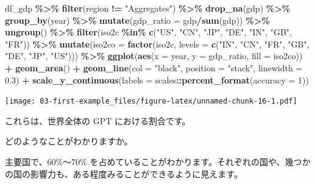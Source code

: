 \documentclass[
  xelatex, ja=standard]{bxjsbook}
\newenvironment{Shaded}{\begin{snugshade}}{\end{snugshade}}
\newcommand{\AttributeTok}[1]{\textcolor[rgb]{0.13,0.29,0.53}{#1}}
\newcommand{\DecValTok}[1]{\textcolor[rgb]{0.00,0.00,0.81}{#1}}
\newcommand{\FloatTok}[1]{\textcolor[rgb]{0.00,0.00,0.81}{#1}}
\newcommand{\FunctionTok}[1]{\textcolor[rgb]{0.13,0.29,0.53}{\textbf{#1}}}
\newcommand{\NormalTok}[1]{#1}
\newcommand{\SpecialCharTok}[1]{\textcolor[rgb]{0.81,0.36,0.00}{\textbf{#1}}}
\newcommand{\StringTok}[1]{\textcolor[rgb]{0.31,0.60,0.02}{#1}}
\theoremstyle{definition}
\theoremstyle{definition}
\theoremstyle{definition}
\theoremstyle{definition}
\theoremstyle{remark}
\begin{document}
\begin{Shaded}
\begin{Highlighting}[]
\NormalTok{df\_gdp }\SpecialCharTok{\%\textgreater{}\%} 
  \FunctionTok{filter}\NormalTok{(region }\SpecialCharTok{!=} \StringTok{"Aggregates"}\NormalTok{) }\SpecialCharTok{\%\textgreater{}\%} \FunctionTok{drop\_na}\NormalTok{(gdp) }\SpecialCharTok{\%\textgreater{}\%} 
  \FunctionTok{group\_by}\NormalTok{(year) }\SpecialCharTok{\%\textgreater{}\%} \FunctionTok{mutate}\NormalTok{(}\AttributeTok{gdp\_ratio =}\NormalTok{ gdp}\SpecialCharTok{/}\FunctionTok{sum}\NormalTok{(gdp)) }\SpecialCharTok{\%\textgreater{}\%} \FunctionTok{ungroup}\NormalTok{() }\SpecialCharTok{\%\textgreater{}\%}
  \FunctionTok{filter}\NormalTok{(iso2c }\SpecialCharTok{\%in\%} \FunctionTok{c}\NormalTok{(}\StringTok{"US"}\NormalTok{, }\StringTok{"CN"}\NormalTok{, }\StringTok{"JP"}\NormalTok{, }\StringTok{"DE"}\NormalTok{, }\StringTok{"IN"}\NormalTok{, }\StringTok{"GB"}\NormalTok{, }\StringTok{"FR"}\NormalTok{))  }\SpecialCharTok{\%\textgreater{}\%}
  \FunctionTok{mutate}\NormalTok{(}\AttributeTok{iso2co =} \FunctionTok{factor}\NormalTok{(iso2c, }\AttributeTok{levels =} \FunctionTok{c}\NormalTok{(}\StringTok{"IN"}\NormalTok{, }\StringTok{"CN"}\NormalTok{, }\StringTok{"FR"}\NormalTok{, }\StringTok{"GB"}\NormalTok{, }\StringTok{"DE"}\NormalTok{, }\StringTok{"JP"}\NormalTok{, }\StringTok{"US"}\NormalTok{))) }\SpecialCharTok{\%\textgreater{}\%}
  \FunctionTok{ggplot}\NormalTok{(}\FunctionTok{aes}\NormalTok{(}\AttributeTok{x =}\NormalTok{ year, }\AttributeTok{y =}\NormalTok{ gdp\_ratio, }\AttributeTok{fill =}\NormalTok{ iso2co)) }\SpecialCharTok{+} \FunctionTok{geom\_area}\NormalTok{() }\SpecialCharTok{+}
  \FunctionTok{geom\_line}\NormalTok{(}\AttributeTok{col =} \StringTok{"black"}\NormalTok{, }\AttributeTok{position =} \StringTok{"stack"}\NormalTok{, }\AttributeTok{linewidth =} \FloatTok{0.3}\NormalTok{) }\SpecialCharTok{+} 
  \FunctionTok{scale\_y\_continuous}\NormalTok{(}\AttributeTok{labels =}\NormalTok{ scales}\SpecialCharTok{::}\FunctionTok{percent\_format}\NormalTok{(}\AttributeTok{accuracy =} \DecValTok{1}\NormalTok{))}
\end{Highlighting}
\end{Shaded}

\texttt{[image: 03-first-example\_files/figure-latex/unnamed-chunk-16-1.pdf]}

これらは、世界全体の GPT における割合です。

どのようなことがわかりますか。

主要国で、60\%〜70\% を占めていることがわかります。それぞれの国や、幾つかの国の影響力も、ある程度みることができるように見えます。
\end{document}
